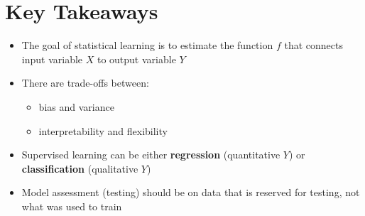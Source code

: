 \section*{Key Takeaways}
\begin{note}

\begin{itemize}
\tightlist
\item  The goal of statistical learning is to estimate the function \(f\)  that connects input variable \(X\) to output variable \(Y\)
\item  There are trade-offs between:

  \begin{itemize}
  \tightlist
  \item   bias and variance
  \item   interpretability and flexibility
  \end{itemize}
\item  Supervised learning can be either \textbf{regression} (quantitative  \(Y\)) or \textbf{classification} (qualitative \(Y\))
\item  Model assessment (testing) should be on data that is reserved for  testing, not what was used to train
\end{itemize}
\end{note}

